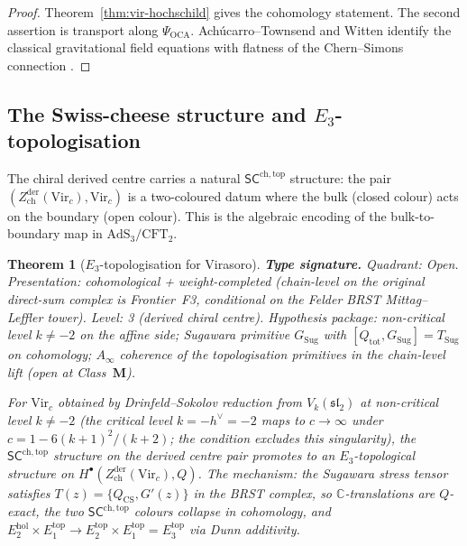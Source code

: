\documentclass[11pt,reqno]{amsart}
\newtheorem{theorem}{Theorem}[section]
\theoremstyle{definition}
\theoremstyle{remark}
\begin{document}
\begin{proof}
Theorem~\ref{thm:vir-hochschild} gives the cohomology statement.
The second assertion is transport along $\Psi_{\mathrm{OCA}}$.
Ach\'ucarro--Townsend and Witten identify the classical gravitational
field equations with flatness of the Chern--Simons connection
\cite{AT86,Wit88}.
\end{proof}

\subsection{The Swiss-cheese structure and $E_3$-topologisation}

The chiral derived centre carries a natural
$\mathsf{SC}^{\mathrm{ch,top}}$ structure: the pair
$(Z^{\mathrm{der}}_{\mathrm{ch}}(\mathrm{Vir}_c),
\mathrm{Vir}_c)$ is a two-coloured datum where the bulk
(closed colour) acts on the boundary (open colour). This is the
algebraic encoding of the bulk-to-boundary map in
$\mathrm{AdS}_3/\mathrm{CFT}_2$.

\begin{theorem}[$E_3$-topologisation for Virasoro]
\label{thm:e3-topologisation}
\textbf{Type signature.} Quadrant: Open.
Presentation: cohomological + weight-completed (chain-level on the
original direct-sum complex is Frontier~F3, conditional on the
Felder BRST Mittag--Leffler tower).
Level: 3 (derived chiral centre).
Hypothesis package: non-critical level $k \ne -2$ on the affine
side; Sugawara primitive $G_{\mathrm{Sug}}$ with
$[Q_{\mathrm{tot}}, G_{\mathrm{Sug}}] = T_{\mathrm{Sug}}$ on
cohomology; $A_\infty$ coherence of the topologisation primitives
in the chain-level lift (open at Class~$\mathbf M$).

For\/ $\mathrm{Vir}_c$ obtained by Drinfeld--Sokolov reduction from\/
$V_k(\mathfrak{sl}_2)$ at non-critical level\/ $k \ne -2$
(the critical level $k = -h^\vee = -2$ maps to $c \to \infty$
under $c = 1 - 6(k+1)^2/(k+2)$; the condition excludes this
singularity), the $\mathsf{SC}^{\mathrm{ch,top}}$
structure on the derived centre pair promotes to an
$E_3$-topological structure on\/ $H^\bullet(Z^{\mathrm{der}}_{\mathrm{ch}}(\mathrm{Vir}_c), Q)$.
The mechanism: the Sugawara stress tensor satisfies\/
$T(z) = \{Q_{\mathrm{CS}}, G'(z)\}$ in the BRST complex, so
$\mathbb{C}$-translations are $Q$-exact, the two
$\mathsf{SC}^{\mathrm{ch,top}}$ colours collapse in cohomology,
and\/ $E_2^{\mathrm{hol}} \times E_1^{\mathrm{top}} \to
E_2^{\mathrm{top}} \times E_1^{\mathrm{top}} = E_3^{\mathrm{top}}$
via Dunn additivity.
\end{theorem}
\end{document}
